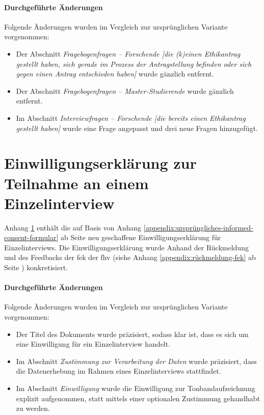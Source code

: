 \documentclass[a4paper,12pt,twoside,numbers=noendperiod]{scrreprt}
\begin{document}
\subsubsection*{Durchgeführte Änderungen}
\label{appendix:änderungen-interview-leitfaden}

Folgende Änderungen wurden im Vergleich zur ursprünglichen Variante vorgenommen:
\begin{itemize}
    \item Der Abschnitt \textit{Fragebogenfragen -- Forschende [die (k)einen Ethikantrag gestellt haben, sich gerade im Prozess der Antragstellung befinden oder sich gegen einen Antrag entschieden haben]} wurde gänzlich entfernt.
    \item Der Abschnitt \textit{Fragebogenfragen -- Master-Studierende} wurde gänzlich entfernt.
    \item Im Abschnitt \textit{Interviewfragen -- Forschende [die bereits einen Ethikantrag gestellt haben]} wurde eine Frage angepasst und drei neue Fragen hinzugefügt.
\end{itemize}



\cleardoublepage
\chapter{Einwilligungserklärung zur Teilnahme an einem Einzelinterview}
\label{appendix:informed-consent-einzelinterview}

Anhang \ref{appendix:informed-consent-einzelinterview} enthält die auf Basis von Anhang \ref{appendix:ursprüngliches-informed-consent-formular} ab Seite \pageref{appendix:ursprüngliches-informed-consent-formular} neu geschaffene Einwilligungserklärung für Einzelinterviews. Die Einwilligungserklärung wurde Anhand der Rückmeldung und des Feedbacks der \acl{fek} der \acl{fhv} (siehe Anhang \ref{appendix:rückmeldung-fek} ab Seite \pageref{appendix:rückmeldung-fek}) konkretisiert.

\subsubsection*{Durchgeführte Änderungen}
\label{appendix:änderungen-informed-consent-einzelinterview}

Folgende Änderungen wurden im Vergleich zur ursprünglichen Variante vorgenommen:
\begin{itemize}
    \item Der Titel des Dokuments wurde präzisiert, sodass klar ist, dass es sich um eine Einwilligung für ein Einzelinterview handelt.
    \item Im Abschnitt \textit{Zustimmung zur Verarbeitung der Daten} wurde präzisiert, dass die Datenerhebung im Rahmen eines Einzelinterviews stattfindet.
    \item Im Abschnitt \textit{Einwilligung} wurde die Einwilligung zur Tonbandaufzeichnung explizit aufgenommen, statt mittels einer optionalen Zustimmung gehandhabt zu werden.
\end{itemize}
\end{document}
